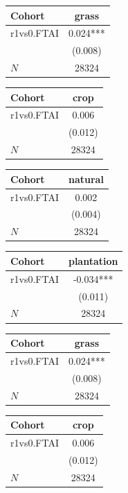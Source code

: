 {
\def\sym#1{\ifmmode^{#1}\else\(^{#1}\)\fi}
\begin{tabular}{l*{1}{c}}
\toprule
Cohort    &    grass   \\
\midrule
r1vs0.FTAI&    0.024***\\
          &  (0.008)   \\
\midrule
\(N\)     &    28324   \\
\bottomrule
\end{tabular}
}
{
\def\sym#1{\ifmmode^{#1}\else\(^{#1}\)\fi}
\begin{tabular}{l*{1}{c}}
\toprule
Cohort    &     crop   \\
\midrule
r1vs0.FTAI&    0.006   \\
          &  (0.012)   \\
\midrule
\(N\)     &    28324   \\
\bottomrule
\end{tabular}
}
{
\def\sym#1{\ifmmode^{#1}\else\(^{#1}\)\fi}
\begin{tabular}{l*{1}{c}}
\toprule
Cohort    &  natural   \\
\midrule
r1vs0.FTAI&    0.002   \\
          &  (0.004)   \\
\midrule
\(N\)     &    28324   \\
\bottomrule
\end{tabular}
}
{
\def\sym#1{\ifmmode^{#1}\else\(^{#1}\)\fi}
\begin{tabular}{l*{1}{c}}
\toprule
Cohort    &plantation   \\
\midrule
r1vs0.FTAI&   -0.034***\\
          &  (0.011)   \\
\midrule
\(N\)     &    28324   \\
\bottomrule
\end{tabular}
}
{
\def\sym#1{\ifmmode^{#1}\else\(^{#1}\)\fi}
\begin{tabular}{l*{1}{c}}
\toprule
Cohort    &    grass   \\
\midrule
r1vs0.FTAI&    0.024***\\
          &  (0.008)   \\
\midrule
\(N\)     &    28324   \\
\bottomrule
\end{tabular}
}
{
\def\sym#1{\ifmmode^{#1}\else\(^{#1}\)\fi}
\begin{tabular}{l*{1}{c}}
\toprule
Cohort    &     crop   \\
\midrule
r1vs0.FTAI&    0.006   \\
          &  (0.012)   \\
\midrule
\(N\)     &    28324   \\
\bottomrule
\end{tabular}
}
